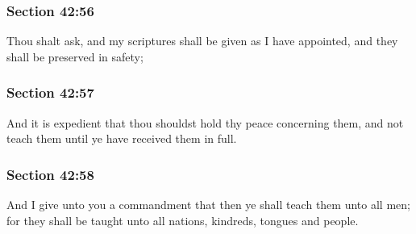 
	\subsubsection{Section 42:56} %
		\label{DC42-56}

		Thou shalt ask, and my scriptures shall be given as I have appointed, and they shall be preserved in safety;


	\subsubsection{Section 42:57} %
		\label{DC42-57}

		And it is expedient that thou shouldst hold thy peace concerning them, and not teach them until ye have received them in full.


	\subsubsection{Section 42:58} %
		\label{DC42-58}

		And I give unto you a commandment that then ye shall teach them unto all men; for they shall be taught unto all nations, kindreds, tongues and people.


